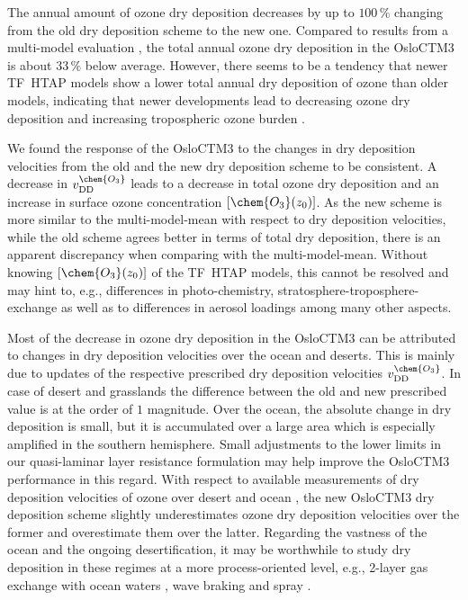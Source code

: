 \documentclass[gmd, manuscript]{copernicus}
\begin{document}
The annual amount of ozone dry deposition decreases by up to $100\,\unit{\%}$ changing from the old dry deposition scheme to the new one. Compared to results from a multi-model evaluation \citep{ACP:Hardacre2015}, the total annual ozone dry deposition in the OsloCTM3 is about $33\,\unit{\%}$ below average. However, there seems to be a tendency that newer TF~HTAP models show a lower total annual dry deposition of ozone than older models, indicating that newer developments lead to decreasing ozone dry deposition and increasing tropospheric ozone burden \citep[e.g.,][]{ACP:Luhar2017,AE:Hu2017}.

We found the response of the OsloCTM3 to the changes in dry deposition velocities from the old and the new dry deposition scheme to be consistent. A decrease in $v_\text{DD}^\chem{O_3}$ leads to a decrease in total ozone dry deposition and an increase in surface ozone concentration $[\chem{O_3}(z_0)]$. As the new scheme is more similar to the multi-model-mean \citep{ACP:Hardacre2015} with respect to dry deposition velocities, while the old scheme agrees better in terms of total dry deposition, there is an apparent discrepancy when comparing with the multi-model-mean. Without knowing $[\chem{O_3}(z_0)]$ of the TF~HTAP models, this cannot be resolved and may hint to, e.g., differences in photo-chemistry, stratosphere-troposphere-exchange as well as to differences in aerosol loadings among many other aspects.

Most of the decrease in ozone dry deposition in the OsloCTM3 can be attributed to changes in dry deposition velocities over the ocean and deserts. This is mainly due to updates of the respective prescribed dry deposition velocities $v_\text{DD}^\chem{O_3}$. In case of desert and grasslands the difference between the old and new prescribed value is at the order of $1$ magnitude. Over the ocean, the absolute change in dry deposition is small, but it is accumulated over a large area which is especially amplified in the southern hemisphere. Small adjustments to the lower limits in our quasi-laminar layer resistance formulation may help improve the OsloCTM3 performance in this regard. With respect to available measurements of dry deposition velocities of ozone over desert \citep{AE:Gusten1995} and ocean \citep{JGR:Helmig2012}, the new OsloCTM3 dry deposition scheme slightly underestimates ozone dry deposition velocities over the former and overestimate them over the latter. Regarding the vastness of the ocean and the ongoing desertification, it may be worthwhile to study dry deposition in these regimes at a more process-oriented level, e.g., 2-layer gas exchange with ocean waters \citep{ACP:Luhar2017}, wave braking and spray \citep{ACP:Pozzer2006}.
\end{document}
